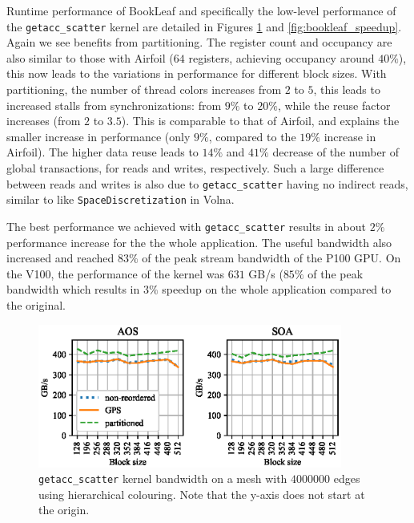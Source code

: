 Runtime performance of BookLeaf and specifically the low-level performance of 
the \texttt{getacc\_scatter} kernel are detailed in Figures
\ref{fig:bookleaf_bw-vs-bs_hier} and \ref{fig:bookleaf_speedup}. Again we see  
benefits from partitioning. The register count and occupancy are also similar to 
those with Airfoil ($64$ registers, achieving occupancy around $40\%$), this 
now leads to the variations in performance for different block sizes. With 
partitioning, the number of thread colors increases from $2$ to $5$, this
leads to increased stalls from synchronizations: from $9\%$ to $20\%$, while
the reuse factor increases (from $2$ to $3.5$). This is comparable to 
that of Airfoil, and explains the smaller increase in performance (only $9\%$, 
compared to the $19\%$ increase in Airfoil). The higher data reuse leads to 
$14\%$ and $41\%$ decrease of the number of global transactions, for reads and 
writes, respectively. Such a large difference between reads and writes is also 
due to \texttt{getacc\_scatter} having no indirect reads, similar to 
like \texttt{SpaceDiscretization} in Volna. 

The best performance we achieved with \texttt{getacc\_scatter} results in about
$2\%$ performance increase for the the whole application. The useful bandwidth
also increased and reached $83\%$ of the peak stream bandwidth of the P100 GPU. 
On the V100, the performance of the kernel was $631$ GB/s ($85\%$ of the peak
bandwidth which results in $3\%$ speedup on the whole application 
compared to the original.

\begin{figure}[Htbp]
  \centering
  \includegraphics[width=10cm]{fig/bookleaf_bw-vs-bs_hier.eps}
  \caption{\texttt{getacc\_scatter} kernel bandwidth on a mesh with $4000000$
  edges using hierarchical colouring. Note that the y-axis does not start at the
  origin.}
  \label{fig:bookleaf_bw-vs-bs_hier}
\end{figure}

